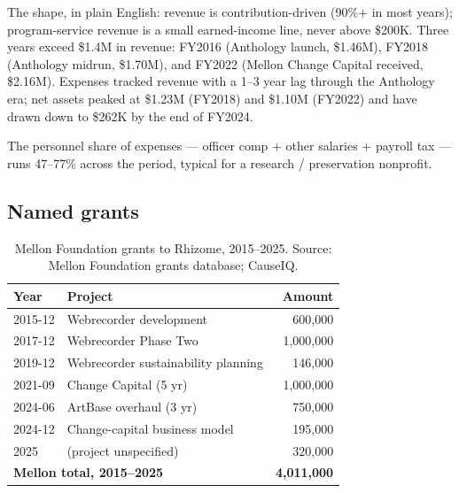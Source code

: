 \documentclass[10pt,letterpaper,twocolumn]{article}
\begin{document}
The shape, in plain English: revenue is contribution-driven (90{\%}+ in most years); program-service revenue is a small earned-income line, never above \$200K. Three years exceed \$1.4M in revenue: FY2016 (Anthology launch, \$1.46M), FY2018 (Anthology midrun, \$1.70M), and FY2022 (Mellon Change Capital received, \$2.16M). Expenses tracked revenue with a 1--3 year lag through the Anthology era; net assets peaked at \$1.23M (FY2018) and \$1.10M (FY2022) and have drawn down to \$262K by the end of FY2024.

The personnel share of expenses --- officer comp + other salaries + payroll tax --- runs 47--77{\%} across the period, typical for a research / preservation nonprofit.

\subsection{Named grants}\label{sec:grants}

\begin{table}[h]
\footnotesize
\centering
\begin{tabularx}{\columnwidth}{l>{\raggedright\arraybackslash\hspace{0pt}}Xr}
\toprule
\textbf{Year} & \textbf{Project} & \textbf{Amount} \\
\midrule
2015-12 & Webrecorder development & 600,000 \\
2017-12 & Webrecorder Phase Two & 1,000,000 \\
2019-12 & Webrecorder sustainability planning & 146,000 \\
2021-09 & Change Capital (5 yr) & 1,000,000 \\
2024-06 & ArtBase overhaul (3 yr) & 750,000 \\
2024-12 & Change-capital business model & 195,000 \\
2025 & (project unspecified) & 320,000 \\
\midrule
\multicolumn{2}{l}{\textbf{Mellon total, 2015--2025}} & \textbf{4,011,000} \\
\bottomrule
\end{tabularx}
\caption{Mellon Foundation grants to Rhizome, 2015--2025. Source: Mellon Foundation grants database; CauseIQ.}
\label{tab:mellon}
\end{table}
\end{document}
